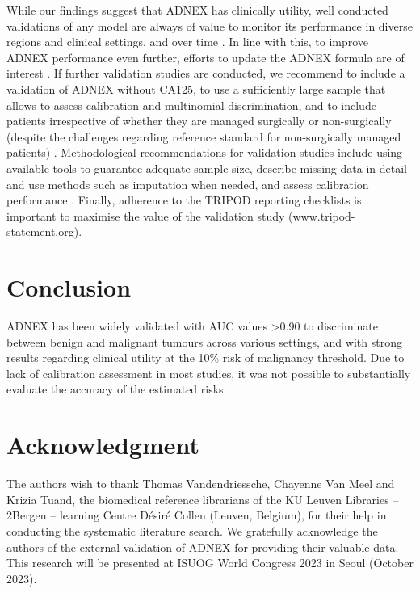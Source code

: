 While our findings suggest that \gls{ADNEX} has clinically utility, well conducted
validations of any model are always of value to monitor its performance in
diverse regions and clinical settings, and over time
 \cite{vancalsterThereNoSuch2023}. In line with this, to improve \gls{ADNEX}
performance even further, efforts to update the \gls{ADNEX} formula are of interest
 \cite{vancalsterThereNoSuch2023,
  onbehalfoftopicgroupevaluatingdiagnostictestsandpredictionmodelsofthestratosinitiativeCalibrationAchillesHeel2019}.
If further validation studies are conducted, we recommend to include a
validation of \gls{ADNEX} without CA125, to use a sufficiently large sample that
allows to assess calibration and multinomial discrimination, and to include
patients irrespective of whether they are managed surgically or non-surgically
(despite the challenges regarding reference standard for non-surgically managed
patients)
 \cite{vancalsterAssessingDiscriminativeAbility2012,vanhoordeAssessingCalibrationMultinomial2014}.
Methodological recommendations for validation studies include using available
tools to guarantee adequate sample size, describe missing data in detail and use
methods such as imputation when needed, and assess calibration performance
 \cite{steyerbergClinicalPredictionModels2009,
  onbehalfoftopicgroupevaluatingdiagnostictestsandpredictionmodelsofthestratosinitiativeCalibrationAchillesHeel2019,
  pateMinimumSampleSize2023,rileyMinimumSampleSize2021,
  siskImputationMissingIndicators2023}.
Finally, adherence to the \gls{TRIPOD} reporting checklists is important to maximise
the value of the validation study (www.tripod-statement.org).

\section{Conclusion}
\gls{ADNEX} has been widely validated with \gls{AUC} values >0.90 to discriminate between
benign and malignant tumours across various settings, and with strong results
regarding clinical utility at the 10\% risk of malignancy threshold. Due to lack
of calibration assessment in most studies, it was not possible to substantially
evaluate the accuracy of the estimated risks.

\section*{Acknowledgment}
The authors wish to thank Thomas Vandendriessche, Chayenne Van Meel and Krizia
Tuand, the biomedical reference librarians of the KU Leuven Libraries – 2Bergen
– learning Centre Désiré Collen (Leuven, Belgium), for their help in conducting
the systematic literature search. We gratefully acknowledge the authors of the
external validation of \gls{ADNEX} for providing their valuable data. This research
will be presented at \gls{ISUOG} World Congress 2023 in Seoul (October 2023).

